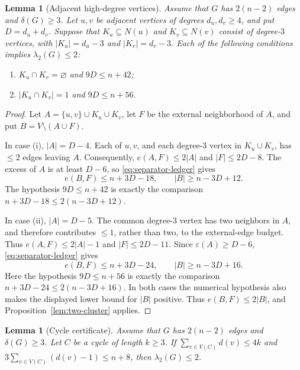 \documentclass[11pt]{article}
\numberwithin{equation}{section}
\newtheorem{lemma}[theorem]{Lemma}
\theoremstyle{definition}
\theoremstyle{remark}
\newcommand{\ac}{\lambda_2}
\begin{document}
\begin{lemma}[Adjacent high-degree vertices]\label{lem:decorated-edge}
Assume that \(G\) has \(2(n-2)\) edges and \(\delta(G)\ge3\).  Let \(u,v\)
be adjacent vertices of degrees \(d_u,d_v\ge4\), and put
\(D=d_u+d_v\).  Suppose that
\(K_u\subseteq N(u)\) and \(K_v\subseteq N(v)\) consist of degree-\(3\)
vertices, with \(|K_u|=d_u-3\) and \(|K_v|=d_v-3\).  Each of the
following conditions implies \(\ac(G)\le2\):
\begin{enumerate}[label=\textup{(\roman*)}]
  \item \(K_u\cap K_v=\varnothing\) and \(9D\le n+42\);
  \item \(|K_u\cap K_v|=1\) and \(9D\le n+56\).
\end{enumerate}
\end{lemma}

\begin{proof}
Let \(A=\{u,v\}\cup K_u\cup K_v\), let \(F\) be the external neighborhood
of \(A\), and put \(B=V\setminus(A\cup F)\).

In case (i), \(|A|=D-4\).  Each of \(u,v\), and each degree-\(3\) vertex
in \(K_u\cup K_v\), has \(\le2\) edges leaving \(A\).  Consequently,
\(e(A,F)\le2|A|\) and \(|F|\le2D-8\).  The excess of \(A\) is at least
\(D-6\), so \eqref{eq:separator-ledger} gives
\[
 e(B,F)\le n+3D-18,
 \qquad |B|\ge n-3D+12.
\]
The hypothesis \(9D\le n+42\) is exactly the comparison
\(n+3D-18\le2(n-3D+12)\).

In case (ii), \(|A|=D-5\).  The common degree-\(3\) vertex has two
neighbors in \(A\), and therefore contributes \(\le1\), rather than
two, to the external-edge budget.  Thus \(e(A,F)\le2|A|-1\) and
\(|F|\le2D-11\).  Since \(\varepsilon(A)\ge D-6\),
\eqref{eq:separator-ledger} gives
\[
 e(B,F)\le n+3D-24,
 \qquad |B|\ge n-3D+16.
\]
Here the hypothesis \(9D\le n+56\) is exactly the comparison
\(n+3D-24\le2(n-3D+16)\).  In both cases the numerical hypothesis also
makes the displayed lower bound for \(|B|\) positive.  Thus
\(e(B,F)\le2|B|\), and Proposition~\ref{lem:two-cluster} applies.
\end{proof}

\begin{lemma}[Cycle certificate]\label{lem:cycle-certificate}
Assume that \(G\) has \(2(n-2)\) edges and \(\delta(G)\ge3\).  Let \(C\)
be a cycle of length \(k\ge3\).  If
\(\sum_{v\in V(C)}d(v)\le4k\) and
\(3\sum_{v\in V(C)}(d(v)-1)\le n+8\),
then \(\ac(G)\le2\).
\end{lemma}
\end{document}

